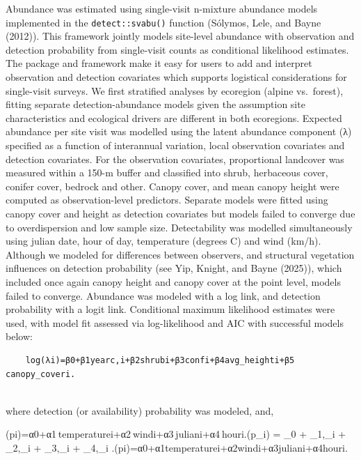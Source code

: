 \documentclass[
  letterpaper,
  DIV=11,
  numbers=noendperiod]{scrartcl}
\begin{document}
Abundance was estimated using single-visit n-mixture abundance models
implemented in the \texttt{detect::svabu()} function (Sólymos, Lele, and
Bayne (2012)). This framework jointly models site-level abundance with
observation and detection probability from single-visit counts as
conditional likelihood estimates. The package and framework make it easy
for users to add and interpret observation and detection covariates
which supports logistical considerations for single-visit surveys. We
first stratified analyses by ecoregion (alpine vs.~forest), fitting
separate detection-abundance models given the assumption site
characteristics and ecological drivers are different in both ecoregions.
Expected abundance per site visit was modelled using the latent
abundance component (λ) specified as a function of interannual
variation, local observation covariates and detection covariates. For
the observation covariates, proportional landcover was measured within a
150-m buffer and classified into shrub, herbaceous cover, conifer cover,
bedrock and other. Canopy cover, and mean canopy height were computed as
observation-level predictors. Separate models were fitted using canopy
cover and height as detection covariates but models failed to converge
due to overdispersion and low sample size. Detectability was modelled
simultaneously using julian date, hour of day, temperature (degrees C)
and wind (km/h). Although we modeled for differences between observers,
and structural vegetation influences on detection probability (see Yip,
Knight, and Bayne (2025)), which included once again canopy height and
canopy cover at the point level, models failed to converge. Abundance
was modeled with a log link, and detection probability with a logit
link. Conditional maximum likelihood estimates were used, with model fit
assessed via log-likelihood and AIC with successful models below:

\begin{verbatim}
    log(λi​)=β0​+β1​yearc,i​+β2​shrubi​+β3​confi​+β4​avg_heighti​+β5​canopy_coveri​.
    
\end{verbatim}

where detection (or availability) probability was modeled, and,

\logit(pi)=α0+α1 temperaturei+α2 windi+α3 juliani+α4 houri.\logit(p\_i)
= \alpha\_0 + \alpha\_1,\_i + \alpha\_2,\_i
+ \alpha\_3,\_i + \alpha\_4,\_i
.\logit(pi\hspace{0pt})=α0\hspace{0pt}+α1\hspace{0pt}temperaturei\hspace{0pt}+α2\hspace{0pt}windi\hspace{0pt}+α3\hspace{0pt}juliani\hspace{0pt}+α4\hspace{0pt}houri\hspace{0pt}.
\end{document}
